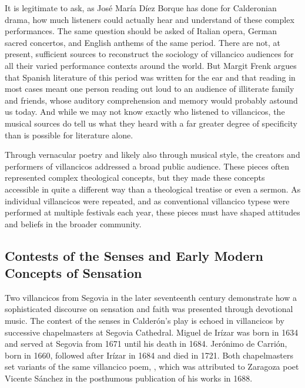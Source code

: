 It is legitimate to ask, as José María Díez Borque has done for Calderonian drama, how much listeners could actually hear and understand of these complex performances.%
    \Autocite{DiezBorque:Publico}
The same question should be asked of Italian opera, German sacred concertos, and English anthems of the same period.
There are not, at present, sufficient sources to reconstruct the sociology of villancico audiences for all their varied performance contexts around the world.
But Margit Frenk argues that Spanish literature of this period was written for the ear and that reading in most cases meant one person reading out loud to an audience of illiterate family and friends, whose auditory comprehension and memory would probably astound us today.%
    \Autocite{Frenk:Voz}
And while we may not know exactly who listened to villancicos, the musical sources do tell us what they heard with a far greater degree of specificity than is possible for literature alone.

Through vernacular poetry and likely also through musical style, the creators and performers of villancicos addressed a broad public audience.
These pieces often represented complex theological concepts, but they made these concepts accessible in quite a different way than a theological treatise or even a sermon.
As individual villancicos were repeated, and as conventional villancico typese were performed at multiple festivals each year, these pieces must have shaped attitudes and beliefs in the broader community.


\subsection{Contests of the Senses and Early Modern Concepts of Sensation}

Two villancicos from Segovia in the later seventeenth century demonstrate how a sophisticated discourse on sensation and faith was presented through devotional music.
The contest of the senses in Calderón's play is echoed in villancicos by successive chapelmasters at Segovia Cathedral.
Miguel de Irízar was born in 1634 and served at Segovia from 1671 until his death in 1684.
Jerónimo de Carrión, born in 1660, followed after Irízar in 1684 and died in 1721.
Both chapelmasters set variants of the same villancico poem, , which was attributed to Zaragoza poet Vicente Sánchez in the posthumous publication of his works in 1688.

